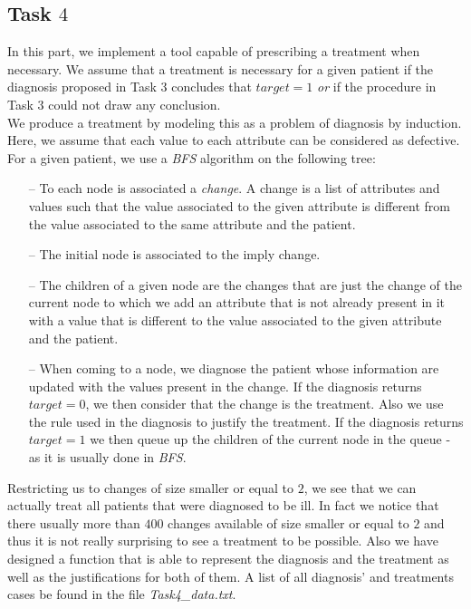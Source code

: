 \documentclass[8pt]{extarticle}
\begin{document}
\subsection{Task $4$}
	In this part, we implement a tool capable of prescribing a treatment when necessary. We assume that a treatment is necessary for a given patient if the diagnosis proposed in Task $3$ concludes that $target=1$ \emph{or} if the procedure in Task $3$ could not draw any conclusion.\\
	We produce a treatment by modeling this as a problem of diagnosis by induction. Here, we assume that each value to each attribute can be considered as defective. For a given patient, we use a \emph{BFS} algorithm on the following tree:
	\begin{itemize}[topsep=0pt,itemsep=0pt,partopsep=0pt, parsep=0pt]
		\item[--] To each node is associated a \emph{change}. A change is a list of attributes and values such that the value associated to the given attribute is different from the value associated to the same attribute and the patient.
		\item[--] The initial node is associated to the imply change.
		\item[--] The children of a given node are the changes that are just the change of the current node to which we add an attribute that is not already present in it with a value that is different to the value associated to the given attribute and the patient.
		\item[--] When coming to a node, we diagnose the patient whose information are updated with the values present in the change. If the diagnosis returns $target=0$, we then consider that the change is the treatment. Also we use the rule used in the diagnosis to justify the treatment. If the diagnosis returns $target=1$ we then queue up the children of the current node in the queue - as it is usually done in \emph{BFS}.
	\end{itemize}
Restricting us to changes of size smaller or equal to $2$, we see that we can actually treat all patients that were diagnosed to be ill. In fact we notice that there usually more than $400$ changes available of size smaller or equal to $2$ and thus it is not really surprising to see a treatment to be possible. Also we have designed a function that is able to represent the diagnosis and the treatment as well as the justifications for both of them. A list of all diagnosis' and treatments cases be found in the file \emph{Task4\_data.txt}.
\end{document}

